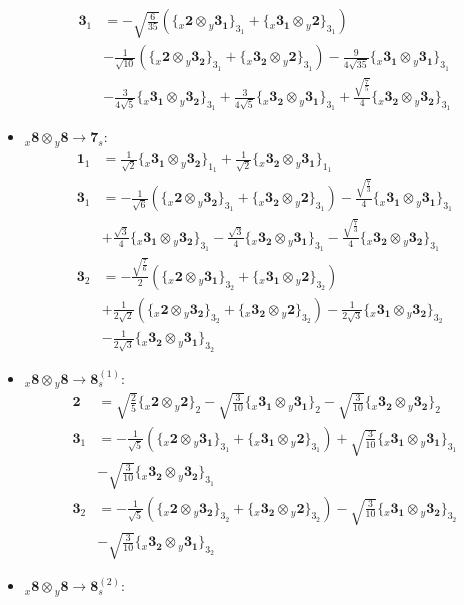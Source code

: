 \documentclass[english]{article}
\newcommand{\rep}[1]{\mathbf{#1}}
\newcommand{\repx}[2]{{}_{#2}\mathbf{#1}}
\newcommand{\subcg}[3]{\big\{ \repx{#1}{x}\otimes\repx{#2}{y}\big\}^{}_{#3}}
\begin{document}
\begin{itemize}
\begin{align*}
\\
\rep{3}_{1} & = -\sqrt{\frac{6}{35}}\left(\subcg{2}{3_{1}}{3_{1}}+\subcg{3_{1}}{2}{3_{1}}\right) \\ 
 & -\frac{1}{\sqrt{10}}\left(\subcg{2}{3_{2}}{3_{1}}+\subcg{3_{2}}{2}{3_{1}}\right)-\frac{9}{4 \sqrt{35}}\subcg{3_{1}}{3_{1}}{3_{1}} \\ 
 & -\frac{3}{4 \sqrt{5}}\subcg{3_{1}}{3_{2}}{3_{1}}+\frac{3}{4 \sqrt{5}}\subcg{3_{2}}{3_{1}}{3_{1}}+\frac{\sqrt{\frac{7}{5}}}{4}\subcg{3_{2}}{3_{2}}{3_{1}}
\end{align*}
\item $\repx{8}{x}\otimes\repx{8}{y}\to\rep{7}_{s}$:
\begin{align*}
\rep{1}_{1} & = \frac{1}{\sqrt{2}}\subcg{3_{1}}{3_{2}}{1_{1}}+\frac{1}{\sqrt{2}}\subcg{3_{2}}{3_{1}}{1_{1}}
\\
\rep{3}_{1} & = -\frac{1}{\sqrt{6}}\left(\subcg{2}{3_{2}}{3_{1}}+\subcg{3_{2}}{2}{3_{1}}\right)-\frac{\sqrt{\frac{7}{3}}}{4}\subcg{3_{1}}{3_{1}}{3_{1}} \\ 
 & +\frac{\sqrt{3}}{4}\subcg{3_{1}}{3_{2}}{3_{1}}-\frac{\sqrt{3}}{4}\subcg{3_{2}}{3_{1}}{3_{1}}-\frac{\sqrt{\frac{7}{3}}}{4}\subcg{3_{2}}{3_{2}}{3_{1}}
\\
\rep{3}_{2} & = -\frac{\sqrt{\frac{7}{6}}}{2}\left(\subcg{2}{3_{1}}{3_{2}}+\subcg{3_{1}}{2}{3_{2}}\right) \\ 
 & +\frac{1}{2 \sqrt{2}}\left(\subcg{2}{3_{2}}{3_{2}}+\subcg{3_{2}}{2}{3_{2}}\right)-\frac{1}{2 \sqrt{3}}\subcg{3_{1}}{3_{2}}{3_{2}} \\ 
 & -\frac{1}{2 \sqrt{3}}\subcg{3_{2}}{3_{1}}{3_{2}}
\end{align*}
\item $\repx{8}{x}\otimes\repx{8}{y}\to\rep{8}_{s}^{(1)}$:
\begin{align*}
\rep{2} & = \sqrt{\frac{2}{5}}\subcg{2}{2}{2}-\sqrt{\frac{3}{10}}\subcg{3_{1}}{3_{1}}{2}-\sqrt{\frac{3}{10}}\subcg{3_{2}}{3_{2}}{2}
\\
\rep{3}_{1} & = -\frac{1}{\sqrt{5}}\left(\subcg{2}{3_{1}}{3_{1}}+\subcg{3_{1}}{2}{3_{1}}\right)+\sqrt{\frac{3}{10}}\subcg{3_{1}}{3_{1}}{3_{1}} \\ 
 & -\sqrt{\frac{3}{10}}\subcg{3_{2}}{3_{2}}{3_{1}}
\\
\rep{3}_{2} & = -\frac{1}{\sqrt{5}}\left(\subcg{2}{3_{2}}{3_{2}}+\subcg{3_{2}}{2}{3_{2}}\right)-\sqrt{\frac{3}{10}}\subcg{3_{1}}{3_{2}}{3_{2}} \\ 
 & -\sqrt{\frac{3}{10}}\subcg{3_{2}}{3_{1}}{3_{2}}
\end{align*}
\item $\repx{8}{x}\otimes\repx{8}{y}\to\rep{8}_{s}^{(2)}$:

\end{itemize}
\end{document}
